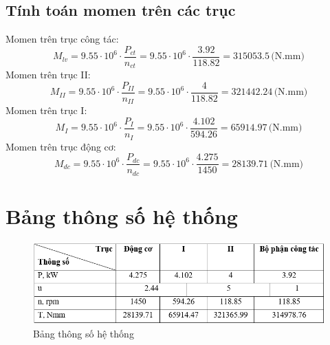 \subsection{Tính toán momen trên các trục}
Momen trên trục công tác:
\begin{equation}
    M_{lv} = 9.55 \cdot 10^6 \cdot \frac{P_{ct}}{n_{ct}} = 9.55 \cdot 10^6 \cdot \frac{3.92}{118.82} = 315053.5 \, \text{(N.mm)}
\end{equation}
Momen trên trục II:
\begin{equation}
    M_{II} = 9.55 \cdot 10^6 \cdot \frac{P_{II}}{n_{II}} = 9.55 \cdot 10^6 \cdot \frac{4}{118.82} = 321442.24 \, \text{(N.mm)}
\end{equation}
Momen trên trục I:
\begin{equation}
    M_{I} = 9.55 \cdot 10^6 \cdot \frac{P_{I}}{n_{I}} = 9.55 \cdot 10^6 \cdot \frac{4.102}{594.26} = 65914.97 \, \text{(N.mm)}
\end{equation}
Momen trên trục động cơ:
\begin{equation}
    M_{dc} = 9.55 \cdot 10^6 \cdot \frac{P_{dc}}{n_{dc}} = 9.55 \cdot 10^6 \cdot \frac{4.275}{1450} = 28139.71 \, \text{(N.mm)}
\end{equation}

\section{Bảng thông số hệ thống}
\begin{figure}[H]
    \centering
    \includegraphics[width=1\textwidth]{pictures/bangdactinh.png}
    \caption{Bảng thông số hệ thống}
\end{figure}